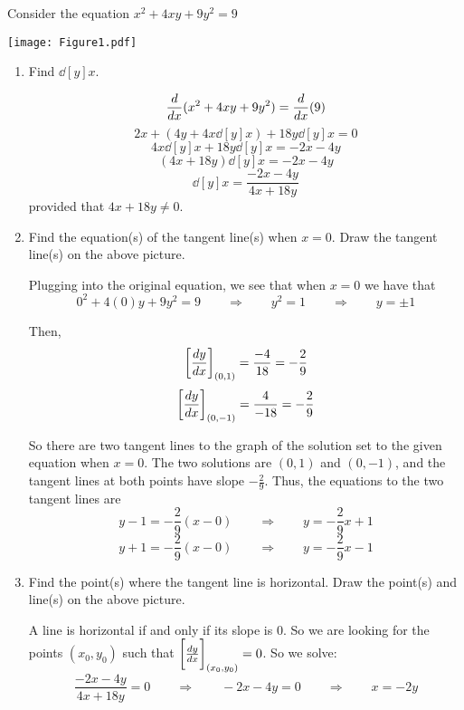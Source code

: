 \documentclass[nooutcomes]{ximera}
\begin{document}
\begin{problem}
Consider the equation $x^2 + 4xy + 9y^2 = 9$

\begin{image}
\texttt{[image: Figure1.pdf]}
\end{image}

	\begin{enumerate}
	
	\item  Find $\dd[y]{x}$.
		\begin{freeResponse}
		$$ \ddx(x^2 + 4xy + 9y^2) = \ddx(9) $$
		$$ 2x + \left(4y + 4x \dd[y]{x} \right) + 18 y \dd[y]{x} = 0 $$
		$$ 4x \dd[y]{x} + 18y \dd[y]{x} = -2x - 4y $$
		$$ (4x+18y) \dd[y]{x} = -2x-4y $$
		$$ \dd[y]{x} = \frac{-2x-4y}{4x+18y} $$
		provided that $4x+18y \neq 0$.
		\end{freeResponse}
		
		
		
	\item  Find the equation(s) of the tangent line(s) when $x=0$.  Draw the tangent line(s) on the above picture.
		\begin{freeResponse}
		Plugging into the original equation, we see that when $x=0$ we have that 
		$$ 0^2 + 4(0)y + 9y^2 = 9 \qquad \Longrightarrow \qquad y^2 = 1 \qquad \Longrightarrow \qquad y = \pm 1 $$
		
		Then,
		$$\eval{\dd[y]{x}}_{(0,1)} = \frac{-4}{18} = -\frac{2}{9}$$
		$$\eval{\dd[y]{x}}_{(0,-1)} = \frac{4}{-18} = -\frac{2}{9} $$
		
		So there are two tangent lines to the graph of the solution set to the given equation when $x=0$.  The two solutions are $(0,1)$ and $(0,-1)$, and the tangent lines at both points have slope $-\frac{2}{9}$.  Thus, the equations to the two tangent lines are
		$$ y - 1 = -\frac{2}{9}(x-0)  \qquad \Longrightarrow \qquad y = -\frac{2}{9}x + 1 $$
		$$ y + 1 = -\frac{2}{9}(x-0) \qquad \Longrightarrow \qquad y = -\frac{2}{9}x - 1 $$
		\end{freeResponse}
		
		
		
	\item  Find the point(s) where the tangent line is horizontal.  Draw the point(s) and line(s) on the above picture.
		\begin{freeResponse}
		A line is horizontal if and only if its slope is 0.  So we are looking for the points $(x_0,y_0)$ such that $\eval{\dd[y]{x}}_{(x_0,y_0)} = 0$.  So we solve:
		$$ \frac{-2x-4y}{4x+18y} = 0\qquad \Longrightarrow \qquad -2x - 4y = 0 \qquad \Longrightarrow \qquad x=-2y$$
		

\end{freeResponse}
\end{enumerate}
\end{problem}
\end{document}
